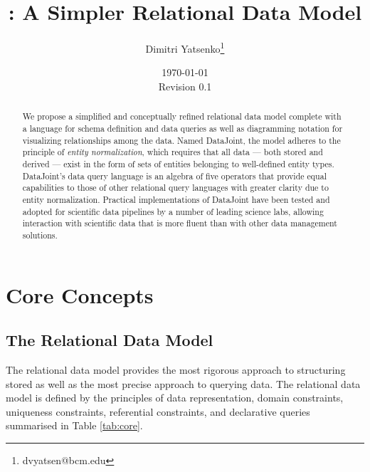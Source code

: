 \documentclass[letter,10pt]{article}
\author[1,2]{Dimitri Yatsenko\thanks{dvyatsen@bcm.edu}}
\affil[1]{Department of Neuroscience, Baylor College of Medicine, Houston, Texas, USA}
\affil[2]{Vathes LLC, Houston, Texas, USA}
\date{\today\\Revision 0.1}
\title{\datajoint: A Simpler Relational Data Model}
\newcommand{\datajoint}{DataJoint\xspace}
\begin{document}
\maketitle
\begin{abstract}
We propose a simplified and conceptually refined relational data model complete with a language for schema definition and data queries as well as  diagramming notation for visualizing relationships among the data.  
Named \datajoint, the model adheres to the principle of \emph{entity normalization}, which requires that all data --- both stored and derived --- exist in the form of sets of entities belonging to well-defined entity types.  
\datajoint's data query language is an algebra of five operators that provide equal capabilities to those of other relational query languages with greater clarity due to entity normalization. 
Practical implementations of \datajoint have been tested and adopted for scientific data pipelines by a number of leading science labs, allowing interaction with scientific data that is more fluent than with other data management solutions.
\end{abstract}
\tableofcontents 

\twocolumn

\section{Core Concepts}
\subsection{The Relational Data Model}
The relational data model \citep{codd_relational_1970} provides the most rigorous approach to structuring stored as well as the most precise approach to querying data.  
The relational data model is defined by the principles of data representation, domain constraints, uniqueness constraints, referential constraints, and declarative queries summarised in Table \ref{tab:core}.
\end{document}

